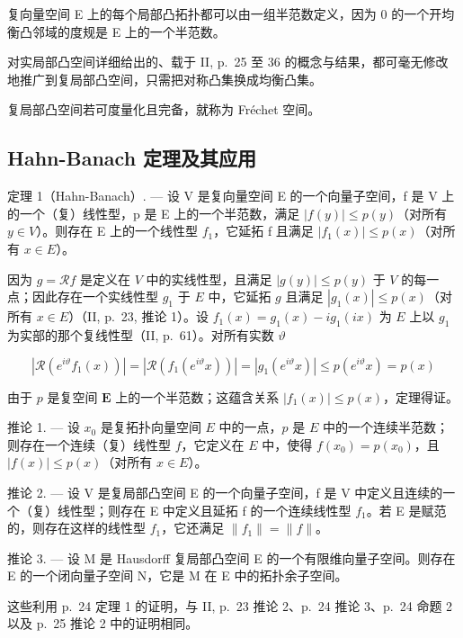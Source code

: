 复向量空间 E 上的每个局部凸拓扑都可以由一组半范数定义，因为 0 的一个开均衡凸邻域的度规是 E 上的一个半范数。

对实局部凸空间详细给出的、载于 II, p.~25 至 36 的概念与结果，都可毫无修改地推广到复局部凸空间，只需把对称凸集换成均衡凸集。

复局部凸空间若可度量化且完备，就称为 Fréchet 空间。

\subsection{Hahn-Banach 定理及其应用}

定理 1（Hahn-Banach）. --- 设 V 是复向量空间 E 的一个向量子空间，f 是 V 上的一个（复）线性型，p 是 E 上的一个半范数，满足 \(|f(y)| \leqslant p(y)\)（对所有 \(y \in V\)）。则存在 E 上的一个线性型 \(f_{1}\)，它延拓 f 且满足 \(|f_{1}(x)| \leqslant p(x)\)（对所有 \(x \in E\)）。

因为 \(g = \mathcal{R}f\) 是定义在 \(V\) 中的实线性型，且满足 \(|g(y)| \leqslant p(y)\) 于 \(V\) 的每一点；因此存在一个实线性型 \(g_1\) 于 \(E\) 中，它延拓 \(g\) 且满足 \(|g_1(x)| \leqslant p(x)\)（对所有 \(x \in E\)）（II, p.~23, 推论 1）。设 \(f_1(x) = g_1(x) - ig_1(ix)\) 为 \(E\) 上以 \(g_1\) 为实部的那个复线性型（II, p.~61）。对所有实数 \(\vartheta\)

\[
\left| \mathcal {R} (e ^ {i \vartheta} f _ {1} (x)) \right| = \left| \mathcal {R} (f _ {1} (e ^ {i \vartheta} x)) \right| = \left| g _ {1} (e ^ {i \vartheta} x) \right| \leqslant p (e ^ {i \vartheta} x) = p (x)
\]

由于 \(p\) 是复空间 \(\mathbf{E}\) 上的一个半范数；这蕴含关系 \(|f_1(x)| \leqslant p(x)\)，定理得证。

推论 1. --- 设 \(x_0\) 是复拓扑向量空间 \(E\) 中的一点，\(p\) 是 \(E\) 中的一个连续半范数；则存在一个连续（复）线性型 \(f\)，它定义在 \(E\) 中，使得 \(f(x_0) = p(x_0)\)，且 \(|f(x)| \leqslant p(x)\)（对所有 \(x \in E\)）。

推论 2. --- 设 V 是复局部凸空间 E 的一个向量子空间，f 是 V 中定义且连续的一个（复）线性型；则存在 E 中定义且延拓 f 的一个连续线性型 \(f_{1}\)。若 E 是赋范的，则存在这样的线性型 \(f_{1}\)，它还满足 \(\|f_{1}\|=\|f\|\)。

推论 3. --- 设 M 是 Hausdorff 复局部凸空间 E 的一个有限维向量子空间。则存在 E 的一个闭向量子空间 N，它是 M 在 E 中的拓扑余子空间。

这些利用 p.~24 定理 1 的证明，与 II, p.~23 推论 2、p.~24 推论 3、p.~24 命题 2 以及 p.~25 推论 2 中的证明相同。


